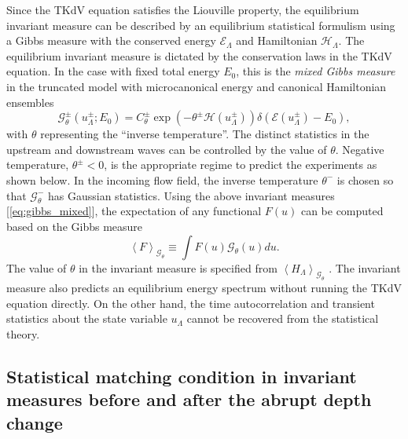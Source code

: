 \documentclass[9pt,twocolumn,twoside,lineno]{pnas-new}
\begin{document}

Since the TKdV equation satisfies the Liouville property, the equilibrium
invariant measure can be described by an equilibrium statistical formulism
\cite{abramov2003hamiltonian,majda2006nonlinear,bajars2013weakly}
using a Gibbs measure with the conserved energy $\mathcal{E}_{\Lambda}$ and
Hamiltonian $\mathcal{H}_{\Lambda}$. The equilibrium invariant measure is dictated
by the conservation laws in the TKdV equation. In the case with fixed
total energy $E_{0}$, this is the \emph{mixed Gibbs measure} in the
truncated model with microcanonical energy and canonical Hamiltonian
ensembles \cite{abramov2003hamiltonian}
\begin{equation}
\mathcal{G}_{\theta}^{\pm}\left(u_{\Lambda}^{\pm};E_{0}\right)=C_{\theta}^{\pm}\exp\left(-\theta^{\pm}\mathcal{H}\left(u_{\Lambda}^{\pm}\right)\right)\delta\left(\mathcal{E}\left(u_{\Lambda}^{\pm}\right)-E_{0}\right),\label{eq:gibbs_mixed}
\end{equation}
with $\theta$ representing the ``inverse temperature''. The distinct
statistics in the upstream and downstream waves can be controlled
by the value of $\theta$. Negative temperature, $\theta^{\pm}<0$, is the appropriate regime to predict the
experiments as shown below. In the incoming flow field, the inverse
temperature $\theta^{-}$ is chosen so that $\mathcal{G}_{\theta}^{-}$
has Gaussian statistics. Using the above invariant measures [\ref{eq:gibbs_mixed}],
the expectation of any functional $F\left(u\right)$ can be computed
based on the Gibbs measure 
\[
\left\langle F\right\rangle _{\mathcal{G}_{\theta}}\equiv\int F\left(u\right)\mathcal{G}_{\theta}\left(u\right)du.
\]
The value of $\theta$ in the invariant measure is specified from
$\left\langle H_{\Lambda}\right\rangle _{\mathcal{G}_{\theta}}$ \cite{abramov2003hamiltonian,bajars2013weakly}.
The invariant measure also predicts an equilibrium energy spectrum
without running the TKdV equation directly. On the other hand, the
time autocorrelation and transient statistics about the state variable
$u_{\Lambda}$ cannot be recovered from the statistical theory.

\subsection{Statistical matching condition in invariant measures before and after the abrupt depth change}
\end{document}
